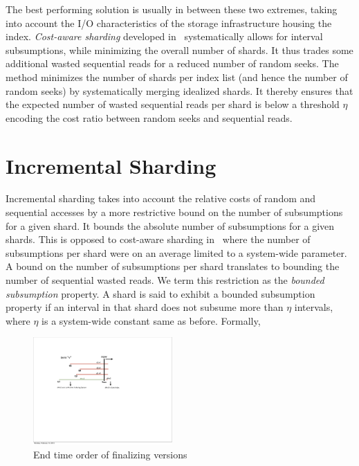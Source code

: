 The best performing solution is usually in between these two extremes,
taking into account the I/O characteristics of the storage
infrastructure housing the index. \emph{Cost-aware sharding} developed
in~\cite{aanand:sigir2011} systematically allows for interval
subsumptions, while minimizing the overall number of shards. It thus
trades some additional wasted sequential reads for a reduced number of
random seeks. The method minimizes the number of shards per index list
(and hence the number of random seeks) by systematically merging
idealized shards. It thereby ensures that the expected number of
wasted sequential reads per shard is below a threshold $\eta$ encoding
the cost ratio between random seeks and sequential reads.

\section{Incremental Sharding}
\label{sec:inc_sharding}

Incremental sharding takes into account the relative costs of random and sequential accesses by a more restrictive bound on the number of subsumptions for a given shard. It bounds the absolute number of subsumptions for a given shards. This is opposed to cost-aware sharding in~\cite{aanand:sigir2011} where the number of subsumptions per shard were on an average limited to a system-wide parameter. A bound on the number of subsumptions per shard translates to bounding the number of sequential wasted reads. We term this restriction as the \emph{bounded subsumption} property. A shard is said to exhibit a bounded subsumption property if an interval in that shard does not subsume more than $\eta$ intervals, where $\eta$ is a system-wide constant same as before. Formally,

\begin{figure}[tb]
	\centering
		\includegraphics[width=0.475\textwidth]{resources/sliding_wind.pdf}
	\caption{End time order of finalizing versions}
	 \label{fig:finalizing_versions}
\end{figure}

